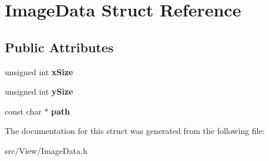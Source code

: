 \hypertarget{structImageData}{}\section{Image\+Data Struct Reference}
\label{structImageData}
\subsection*{Public Attributes}
\begin{DoxyCompactItemize}
\item 
unsigned int {\bfseries x\+Size}\hypertarget{structImageData_ae356932e0569700e204cd40eee304cb0}{}\label{structImageData_ae356932e0569700e204cd40eee304cb0}

\item 
unsigned int {\bfseries y\+Size}\hypertarget{structImageData_a983cd6be7a6728beec0c89d21c8ca3e4}{}\label{structImageData_a983cd6be7a6728beec0c89d21c8ca3e4}

\item 
const char $\ast$ {\bfseries path}\hypertarget{structImageData_abdf724335a32a9621a7f42612382bae3}{}\label{structImageData_abdf724335a32a9621a7f42612382bae3}

\end{DoxyCompactItemize}


The documentation for this struct was generated from the following file\+:\begin{DoxyCompactItemize}
\item 
src/\+View/Image\+Data.\+h\end{DoxyCompactItemize}
